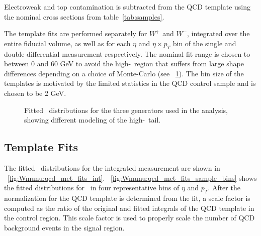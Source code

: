 Electroweak and top contamination is subtracted from the QCD template using the nominal cross sections from table~\ref{tab:samples}.

The template fits are performed separately for $W^+$ and $W^-$, integrated over the entire fiducial volume, as well as for each $\eta$ and $\eta \times p_T$ bin of the single and double differential measurement respectively. The nominal fit range is chosen to between 0 and 60 GeV to avoid the high-\MET\ region that suffers from large shape differences depending on a choice of Monte-Carlo (see \Fig~\ref{fig:Wmunu:qcd_val_generators}). The bin size of the templates is motivated by the limited statistics in the QCD control sample and is chosen to be 2 GeV.

\begin{figure}[phtb]
  \begin{center}
 \caption{ Fitted \MET\ distributions for the three generators used in the analysis, showing different modeling of the high-\MET\ tail. }
 \label{fig:Wmunu:qcd_val_generators}
 \end{center}
\end{figure}

\subsection{Template Fits}
The fitted \MET\ distributions for the integrated measurement are shown in \Fig~\ref{fig:Wmunu:qcd_met_fits_int}.
\Fig~\ref{fig:Wmunu:qcd_met_fits_sample_bins} shows the fitted distributions for \Wmunup\ in four representative bins of $\eta$ and $p_T$. After the normalization for the QCD template is determined from the fit, a scale factor is computed as the ratio of the original and fitted integrals of the QCD template in the control region. This scale factor is used to properly scale the number of QCD background events in the signal region.


